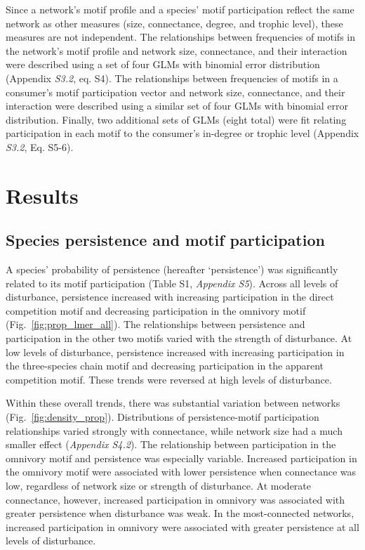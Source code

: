 \documentclass[12pt]{article}
\begin{document}
\begin{spacing}{1.0}
            Since a network's motif profile and a species' motif participation reflect the same network as other measures (size, connectance, degree, and trophic level), these measures are not independent. 
            The relationships between frequencies of motifs in the network's motif profile and network size, connectance, and their interaction were described using a set of four GLMs with binomial error distribution (Appendix \emph{S3.2}, eq. S4).
            The relationships between frequencies of motifs in a consumer's motif participation vector and network size, connectance, and their interaction were described using a similar set of four GLMs with binomial error distribution.
            Finally, two additional sets of GLMs (eight total) were fit relating participation in each motif to the consumer's in-degree or trophic level (Appendix \emph{S3.2}, Eq. S5-6).

        
\section*{Results}

    \subsection*{Species persistence and motif participation} 

        A species' probability of persistence (hereafter `persistence') was significantly related to its motif participation (Table S1, \emph{Appendix S5}).
        Across all levels of disturbance, persistence increased with increasing participation in the direct competition motif and decreasing participation in the omnivory motif (Fig.~\ref{fig:prop_lmer_all}).
        The relationships between persistence and participation in the other two motifs varied with the strength of disturbance.
        At low levels of disturbance, persistence increased with increasing participation in the three-species chain motif and decreasing participation in the apparent competition motif.
        These trends were reversed at high levels of disturbance.
    

        Within these overall trends, there was substantial variation between networks (Fig.~\ref{fig:density_prop}).
        Distributions of persistence-motif participation relationships varied strongly with connectance, while network size had a much smaller effect (\emph{Appendix S4.2}).
        The relationship between participation in the omnivory motif and persistence was especially variable.
        Increased participation in the omnivory motif were associated with lower  persistence when connectance was low, regardless of network size or strength of disturbance.
        At moderate connectance, however, increased participation in omnivory was associated with greater persistence when disturbance was weak.
        In the most-connected networks, increased participation in omnivory were associated with greater persistence at all levels of disturbance.


\end{spacing}
\end{document}
